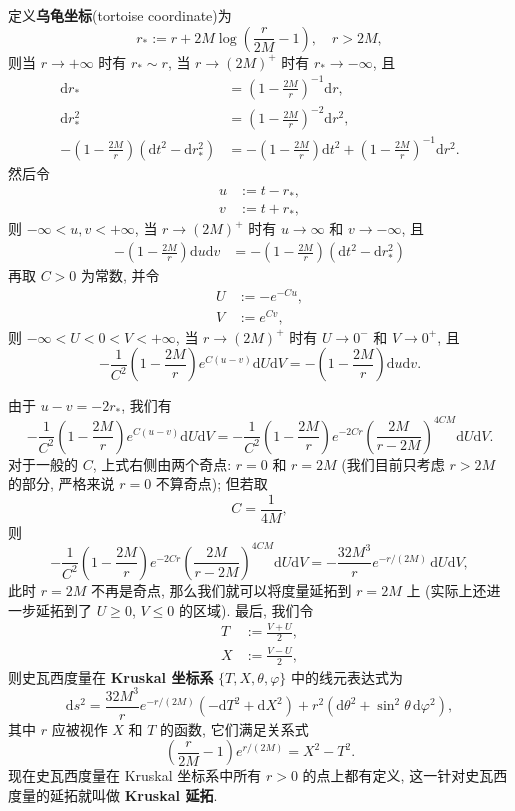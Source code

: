 定义{\bf 乌龟坐标}(tortoise coordinate)为
\[	r_* := r+2M\log\left( \frac{r}{2M}-1 \right),\quad r>2M, \]
则当 $r\to+\infty$ 时有 $r_*\sim r$, 当 $r\to (2M)^+$ 时有 $r_*\to-\infty$, 且
\[ \begin{aligned}
	\mathrm{d}r_*&=\left( 1-\frac{2M}{r} \right)^{-1}\mathrm{d}r,\\
	\mathrm{d}r_*^2&=\left( 1-\frac{2M}{r} \right)^{-2}\mathrm{d}r^2,\\
	-\left( 1-\frac{2M}{r} \right)(\mathrm{d}t^2-\mathrm{d}r_*^2)&=-\left( 1-\frac{2M}{r} \right)\mathrm{d}t^2+\left( 1-\frac{2M}{r} \right)^{-1}\mathrm{d}r^2.
\end{aligned} \]
然后令
\[\begin{aligned}
	u &:= t-r_*,\\
	v &:= t+r_*, 
\end{aligned}\]
则 $-\infty<u,v<+\infty$, 当 $r\to(2M)^{+}$ 时有 $u\to\infty$ 和 $v\to-\infty$, 且
\[\begin{aligned}
	-\left( 1-\frac{2M}{r} \right)\mathrm{d}u\mathrm{d}v &= -\left( 1-\frac{2M}{r} \right)(\mathrm{d}t^2-\mathrm{d}r_*^2)
\end{aligned}\]
再取 $C>0$ 为常数, 并令
\[ \begin{aligned}
	U &:= -e^{-Cu},\\
	V &:= e^{Cv},
\end{aligned} \]
则 $-\infty<U<0<V<+\infty$, 当 $r\to(2M)^{+}$ 时有 $U\to 0^-$ 和 $V\to 0^+$, 且
\[ -\frac{1}{C^2}\left( 1-\frac{2M}{r} \right)e^{C(u-v)}\mathrm{d}U\mathrm{d}V=-\left( 1-\frac{2M}{r} \right)\mathrm{d}u\mathrm{d}v. \]

由于 $u-v=-2r_*$, 我们有
\[ -\frac{1}{C^2}\left( 1-\frac{2M}{r} \right)e^{C(u-v)}\mathrm{d}U\mathrm{d}V=-\frac{1}{C^2}\left( 1-\frac{2M}{r} \right)e^{-2Cr}\left( \frac{2M}{r-2M} \right)^{4CM}\mathrm{d}U\mathrm{d}V. \] 
对于一般的 $C$, 上式右侧由两个奇点: $r=0$ 和 $r=2M$ (我们目前只考虑 $r>2M$ 的部分, 严格来说 $r=0$ 不算奇点); 但若取
\[ C=\frac{1}{4M}, \] 
则
\[ -\frac{1}{C^2}\left( 1-\frac{2M}{r} \right)e^{-2Cr}\left( \frac{2M}{r-2M} \right)^{4CM}\mathrm{d}U\mathrm{d}V=-\frac{32M^3}{r}e^{-r/(2M)}\,\mathrm{d}U\mathrm{d}V, \] 
此时 $r=2M$ 不再是奇点, 那么我们就可以将度量延拓到 $r=2M$ 上 (实际上还进一步延拓到了 $U\geq 0$, $V\leq 0$ 的区域). 最后, 我们令
\[\begin{aligned}
	T &:= \frac{V+U}{2},\\
	X &:= \frac{V-U}{2},
\end{aligned}\]
则史瓦西度量在 {\bf Kruskal 坐标系} $\{T,X,\theta,\varphi\}$ 中的线元表达式为
\[ \mathrm{d}s^2=\frac{32M^3}{r}e^{-r/(2M)}(-\mathrm{d}T^2+\mathrm{d}X^2)+r^2(\mathrm{d}\theta^2+\sin^2\theta\,\mathrm{d}\varphi^2), \] 
其中 $r$ 应被视作 $X$ 和 $T$ 的函数, 它们满足关系式
\[ \left( \frac{r}{2M}-1 \right)e^{r/(2M)}=X^2-T^2. \] 
现在史瓦西度量在 Kruskal 坐标系中所有 $r>0$ 的点上都有定义, 这一针对史瓦西度量的延拓就叫做 {\bf Kruskal 延拓}. 

